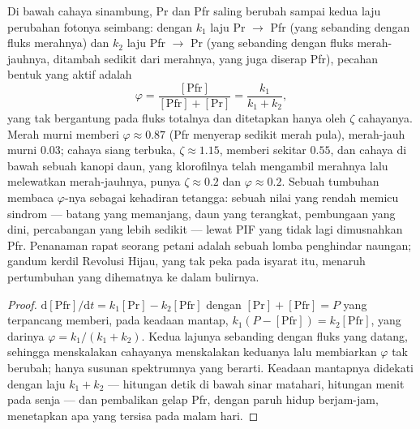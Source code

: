 \begin{proposition}\label{prop:b3:plant-molecular-physiology:photoequilibrium}
Di bawah cahaya sinambung, Pr dan Pfr saling berubah sampai kedua
laju perubahan fotonya seimbang: dengan $k_{1}$ laju Pr $\to$ Pfr
(yang sebanding dengan fluks merahnya) dan $k_{2}$ laju Pfr $\to$ Pr
(yang sebanding dengan fluks merah-jauhnya, ditambah sedikit dari merahnya, yang juga
diserap Pfr), pecahan bentuk yang aktif adalah
\[
\varphi = \frac{[\text{Pfr}]}{[\text{Pfr}] + [\text{Pr}]} = \frac{k_{1}}{k_{1} + k_{2}},
\]
yang tak bergantung pada fluks totalnya dan ditetapkan hanya oleh \emph{} $\zeta$ cahayanya. Merah murni memberi $\varphi \approx 0.87$ (Pfr
menyerap sedikit merah pula), merah-jauh murni $0.03$; cahaya siang terbuka, $\zeta \approx
1.15$, memberi sekitar $0.55$, dan cahaya di bawah sebuah kanopi daun, yang
klorofilnya telah mengambil merahnya lalu melewatkan merah-jauhnya, punya
$\zeta \approx 0.2$ dan $\varphi \approx 0.2$. Sebuah tumbuhan membaca
$\varphi$-nya sebagai kehadiran tetangga: sebuah nilai yang rendah memicu
sindrom \emph{} --- batang yang memanjang, daun yang terangkat,
pembungaan yang dini, percabangan yang lebih sedikit --- lewat PIF yang tidak lagi
dimusnahkan Pfr. Penanaman rapat seorang petani adalah sebuah lomba penghindar naungan;
gandum kerdil Revolusi Hijau, yang tak peka pada isyarat itu, menaruh
pertumbuhan yang dihematnya ke dalam bulirnya.
\end{proposition}
\begin{proof}
$\mathrm{d}[\text{Pfr}]/\mathrm{d}t = k_{1}[\text{Pr}] - k_{2}[\text{Pfr}]$
dengan $[\text{Pr}] + [\text{Pfr}] = P$ yang terpancang memberi, pada keadaan mantap,
$k_{1}(P - [\text{Pfr}]) = k_{2}[\text{Pfr}]$, yang darinya $\varphi = k_{1}/
(k_{1} + k_{2})$. Kedua lajunya sebanding dengan fluks yang datang, sehingga
menskalakan cahayanya menskalakan keduanya lalu membiarkan $\varphi$ tak berubah; hanya
susunan spektrumnya yang berarti. Keadaan mantapnya didekati dengan laju
$k_{1} + k_{2}$ --- hitungan detik di bawah sinar matahari, hitungan menit pada senja --- dan
pembalikan gelap Pfr, dengan paruh hidup berjam-jam, menetapkan apa yang tersisa pada
malam hari.
\end{proof}

